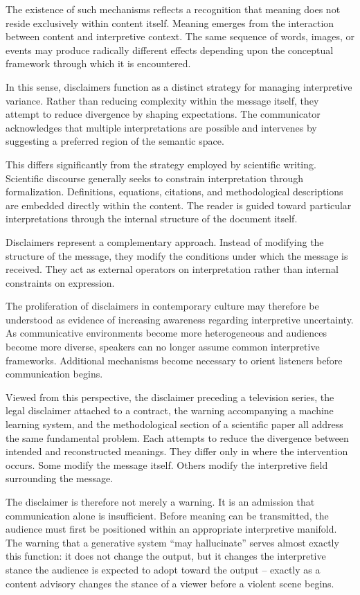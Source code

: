 \documentclass[11pt]{article}
\theoremstyle{plain}
\begin{document}
The existence of such mechanisms reflects a recognition that meaning does not reside exclusively within content itself. Meaning emerges from the interaction between content and interpretive context. The same sequence of words, images, or events may produce radically different effects depending upon the conceptual framework through which it is encountered.

In this sense, disclaimers function as a distinct strategy for managing interpretive variance. Rather than reducing complexity within the message itself, they attempt to reduce divergence by shaping expectations. The communicator acknowledges that multiple interpretations are possible and intervenes by suggesting a preferred region of the semantic space.

This differs significantly from the strategy employed by scientific writing. Scientific discourse generally seeks to constrain interpretation through formalization. Definitions, equations, citations, and methodological descriptions are embedded directly within the content. The reader is guided toward particular interpretations through the internal structure of the document itself.

Disclaimers represent a complementary approach. Instead of modifying the structure of the message, they modify the conditions under which the message is received. They act as external operators on interpretation rather than internal constraints on expression.

The proliferation of disclaimers in contemporary culture may therefore be understood as evidence of increasing awareness regarding interpretive uncertainty. As communicative environments become more heterogeneous and audiences become more diverse, speakers can no longer assume common interpretive frameworks. Additional mechanisms become necessary to orient listeners before communication begins.

Viewed from this perspective, the disclaimer preceding a television series, the legal disclaimer attached to a contract, the warning accompanying a machine learning system, and the methodological section of a scientific paper all address the same fundamental problem. Each attempts to reduce the divergence between intended and reconstructed meanings. They differ only in where the intervention occurs. Some modify the message itself. Others modify the interpretive field surrounding the message.

The disclaimer is therefore not merely a warning. It is an admission that communication alone is insufficient. Before meaning can be transmitted, the audience must first be positioned within an appropriate interpretive manifold. The warning that a generative system ``may hallucinate'' serves almost exactly this function: it does not change the output, but it changes the interpretive stance the audience is expected to adopt toward the output -- exactly as a content advisory changes the stance of a viewer before a violent scene begins.
\end{document}
